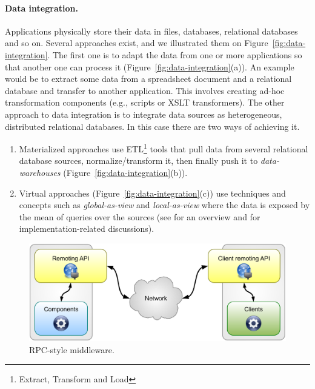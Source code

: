 \paragraph{Data integration.}
Applications physically store their data in files, databases, relational databases and so on. Several approaches exist, and we illustrated them on Figure~\ref{fig:data-integration}. The first one is to adapt the data from one or more applications so that another one can process it (Figure~\ref{fig:data-integration}(a)). An example would be to extract some data from a spreadsheet document and a relational database and transfer to another application. This involves creating ad-hoc transformation components (e.g., scripts or XSLT transformers). The other approach to data integration is to integrate data sources as heterogeneous, distributed relational databases. In this case there are two ways of achieving it.
\begin{enumerate}

	\item Materialized approaches use ETL\footnote{Extract, Transform and Load} tools that pull data from several relational database sources, normalize/transform it, then finally push it to \emph{data-warehouses} (Figure~\ref{fig:data-integration}(b)).
	
	\item Virtual approaches (Figure~\ref{fig:data-integration}(c)) use techniques and concepts such as \emph{global-as-view} and \emph{local-as-view} where the data is exposed by the mean of queries over the sources (see \cite{Ullman00,Lenzerini02} for an overview and \cite{ChawatheGHPUW94,LevyRO96,LattesR00,HalevyIMMST04} for implementation-related discussions).

\end{enumerate}

\begin{figure}[htbp]
    \centering
    \includegraphics[width=\textwidth]{content/web-services/rpc-middleware}
    \caption{RPC-style middleware.}
    \label{fig:rpc-middleware}
\end{figure}

